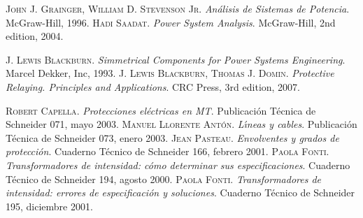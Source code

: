 \begin{thebibliography}{99}
     \textsc{John J. Grainger, William D. Stevenson Jr}. \textsl{An\'{a}lisis de Sistemas de Potencia}.  McGraw-Hill, 1996.
     \textsc{Hadi Saadat}. \textsl{Power System Analysis}.  McGraw-Hill, 2nd edition, 2004.

     \textsc{J. Lewis Blackburn}. \textsl{Simmetrical Components for Power Systems Engineering}.  Marcel Dekker, Inc, 1993.
     \textsc{J. Lewis Blackburn, Thomas J. Domin}. \textsl{Protective Relaying. Principles and Applications}.  CRC Press, 3rd edition, 2007.

     \textsc{Robert Capella}. \textsl{Protecciones el\'{e}ctricas en MT}.  Publicaci\'{o}n T\'{e}cnica de Schneider 071, mayo 2003.
     \textsc{Manuel Llorente Ant\'{o}n}. \textsl{L\'{\i}neas y cables}.  Publicaci\'{o}n T\'{e}cnica de Schneider 073, enero 2003.
     \textsc{Jean Pasteau}. \textsl{Envolventes y grados de protecci\'{o}n}.  Cuaderno T\'{e}cnico de Schneider 166, febrero 2001.
     \textsc{Paola Fonti}. \textsl{Transformadores de intensidad: c\'{o}mo determinar sus especificaciones}.  Cuaderno T\'{e}cnico de Schneider 194, agosto 2000.
     \textsc{Paola Fonti}. \textsl{Transformadores de intensidad: errores de especificaci\'{o}n y soluciones}.  Cuaderno T\'{e}cnico de Schneider 195, diciembre 2001.

\end{thebibliography} 